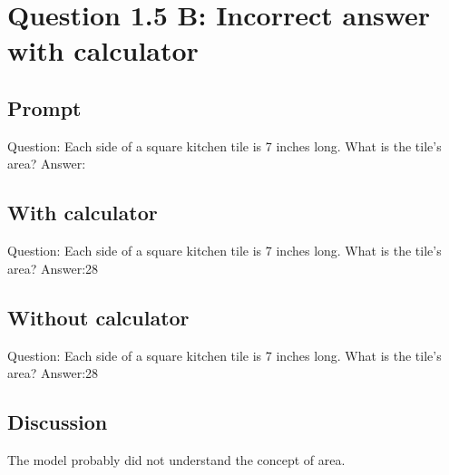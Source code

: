 \documentclass[11pt]{article}
\begin{document}
\section{Question 1.5 B: Incorrect answer with calculator}
\label{sec:org5b232a9}
\subsection{Prompt}
\label{sec:org9b3083e}
Question: Each side of a square kitchen tile is 7 inches long. What is the tile's area?
Answer:
\subsection{With calculator}
\label{sec:org20a7f5f}
Question: Each side of a square kitchen tile is 7 inches long. What is the tile's area?
Answer:\label{org4a6583c}28
\subsection{Without calculator}
\label{sec:org81e3f44}
Question: Each side of a square kitchen tile is 7 inches long. What is the tile's area?
Answer:\label{org78d20dc}28
\subsection{Discussion}
\label{sec:org0f3391b}
The model probably did not understand the concept of area.
\end{document}
